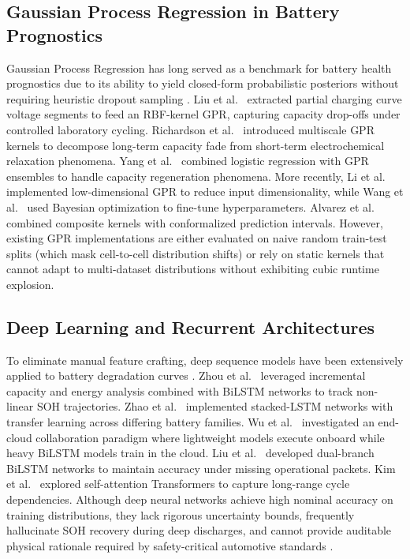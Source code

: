 \documentclass[a4paper,fleqn]{cas-sc}
\begin{document}
\subsection{Gaussian Process Regression in Battery Prognostics}
Gaussian Process Regression has long served as a benchmark for battery health prognostics due to its ability to yield closed-form probabilistic posteriors without requiring heuristic dropout sampling \cite{he2011prognostics, xing2013ensemble}. Liu et al.~\cite{liu2018novel} extracted partial charging curve voltage segments to feed an RBF-kernel GPR, capturing capacity drop-offs under controlled laboratory cycling. Richardson et al.~\cite{richardson2019multiscale} introduced multiscale GPR kernels to decompose long-term capacity fade from short-term electrochemical relaxation phenomena. Yang et al.~\cite{yang2018multiscale} combined logistic regression with GPR ensembles to handle capacity regeneration phenomena. More recently, Li et al.~\cite{li2024lowdim} implemented low-dimensional GPR to reduce input dimensionality, while Wang et al.~\cite{wang2024bayesian} used Bayesian optimization to fine-tune hyperparameters. Alvarez et al.~\cite{alvarez2026uncertainty} combined composite kernels with conformalized prediction intervals. However, existing GPR implementations are either evaluated on naive random train-test splits (which mask cell-to-cell distribution shifts) or rely on static kernels that cannot adapt to multi-dataset distributions without exhibiting cubic runtime explosion.

\subsection{Deep Learning and Recurrent Architectures}
To eliminate manual feature crafting, deep sequence models have been extensively applied to battery degradation curves \cite{chen2024lstm}. Zhou et al.~\cite{zhou2023bilstm} leveraged incremental capacity and energy analysis combined with BiLSTM networks to track non-linear SOH trajectories. Zhao et al.~\cite{zhao2024stacked} implemented stacked-LSTM networks with transfer learning across differing battery families. Wu et al.~\cite{wu2024endcloud} investigated an end-cloud collaboration paradigm where lightweight models execute onboard while heavy BiLSTM models train in the cloud. Liu et al.~\cite{liu2026dualbranch} developed dual-branch BiLSTM networks to maintain accuracy under missing operational packets. Kim et al.~\cite{kim2026uncertainty} explored self-attention Transformers to capture long-range cycle dependencies. Although deep neural networks achieve high nominal accuracy on training distributions, they lack rigorous uncertainty bounds, frequently hallucinate SOH recovery during deep discharges, and cannot provide auditable physical rationale required by safety-critical automotive standards \cite{sun2024interpretable, park2025feature}.
\end{document}

